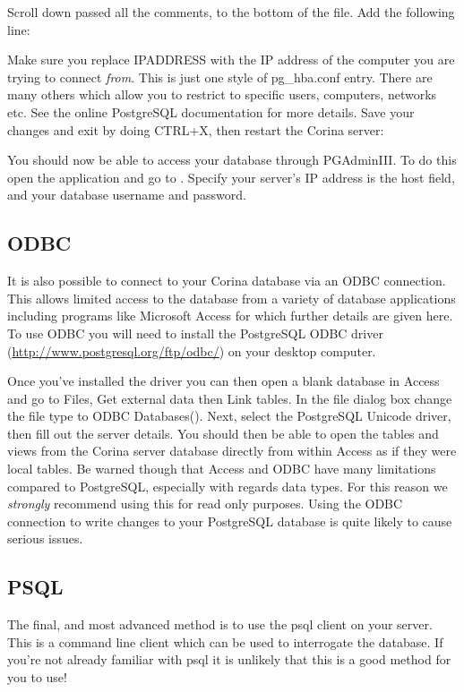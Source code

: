 
Scroll down passed all the comments, to the bottom of the file.  Add the following line:


Make sure you replace IPADDRESS with the IP address of the computer you are trying to connect \emph{from}. This is just one style of pg\_hba.conf entry.  There are many others which allow you to restrict to specific users, computers, networks etc.  See the online PostgreSQL documentation for more details.  Save your changes and exit by doing CTRL+X, then restart the Corina server:


You should now be able to access your database through PGAdminIII. To do this open the application and go to .  Specify your server's IP address is the host field, and your database username and password.


\subsection{ODBC}
It is also possible to connect to your Corina database via an ODBC connection.  This allows limited access to the database from a variety of database applications including programs like Microsoft Access for which further details are given here.   To use ODBC you will need to install the PostgreSQL ODBC driver (\url{http://www.postgresql.org/ftp/odbc/}) on your desktop computer.

Once you've installed the driver you can then open a blank database in Access and go to Files, Get external data then Link tables.  In the file dialog box change the file type to ODBC Databases().  Next, select the PostgreSQL Unicode driver, then fill out the server details.  You should then be able to open the tables and views from the Corina server database directly from within Access as if they were local tables.  Be warned though that Access and ODBC have many limitations compared to PostgreSQL, especially with regards data types.  For this reason we \emph{strongly} recommend using this for read only purposes.  Using the ODBC connection to write changes to your PostgreSQL database is quite likely to cause serious issues. 

\subsection{PSQL}
The final, and most advanced method is to use the psql client on your server.  This is a command line client which can be used to interrogate the database.  If you're not already familiar with psql it is unlikely that this is a good method for you to use!


